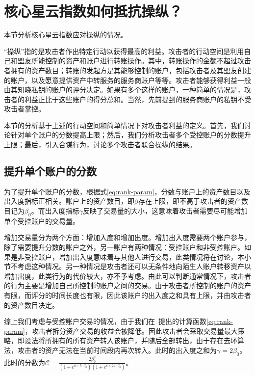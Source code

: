 
\section{核心星云指数如何抵抗操纵？}
本节分析核心星云指数应对操纵的情况。

“操纵”指的是攻击者作出特定行动以获得最高的利益。攻击者的行动空间是利用自己和盟友所能控制的资产和账户进行转账操作。其中，转账操作的金额不超过攻击者拥有的资产数目；转账的发起方是其能够控制的账户，包括攻击者及其盟友创建的账户，以及愿意提供资产中转服务的服务商账户等等。攻击者能够获得利益一般由其知晓私钥的账户的评分决定。如果有多个这样的账户，一种简单的情况是，攻击者的利益正比于这些账户的得分总和。当然，先前提到的服务商账户的私钥不受攻击者掌控。

本节的分析基于上述的行动空间和简单情况下对攻击者利益的定义。首先，我们讨论针对单个账户的分数提高上限；然后，我们分析攻击者多个受控账户的分数提升上限；最后，引入合谋行为，讨论多个攻击者联合操纵的结果。


\subsection{提升单个账户的分数 \label{sec:cheat-single}}
为了提升单个账户的分数，根据式\ref{eq:rank-param}，分数与账户上的资产数目以及出入度指标正相关。账户上的资产数目，即$\beta$存在上限，即不高于攻击者的资产数目记为$\beta_0$。而出入度指标$\gamma$反映了交易量的大小，这意味着攻击者需要尽可能增加单个受控账户的交易量。

增加交易量分为两个方面：增加入度和增加出度。增加出入度需要两个账户参与，除了需要提升分数的账户之外，另一账户有两种情况：受控账户和非受控账户。如果是非受控账户，增加出入度意味着与其他人进行交易，此类情况将在讨论，本小节不考虑这种情况。另一种情况是攻击者还可以无条件地向陌生人账户转移资产以增加出度，此类行为的代价较大，亦不予考虑。由此可以判断通常情况下，攻击者的行为主要是增加自己所控制的账户之间的交易。由于攻击者所控制的账户的资产有限，而评分的时间长度也有限，因此该账户的出入度之和具有上限，并由攻击者的资产数目决定。

综上我们考虑与受控账户交易的情况，由于我们在~提出的计算函数\ref{eq:rank-param}，攻击者拆分资产交易的收益会被降低。因此攻击者会采取交易量最大策略，即设法将所拥有的所有资产转入该账户，并随后全部转出，由于存在去环算法，攻击者的资产无法在当前时间段内再次转入。此时的出入度之和为$\gamma = 2 \beta_0$。此时的分数为$\mathcal{C} =  \frac{2 \beta_0 ^2}{ (1+e^{a + b \cdot \beta_0}) (1+e^{c + 2 d \cdot \beta_0})}$。

